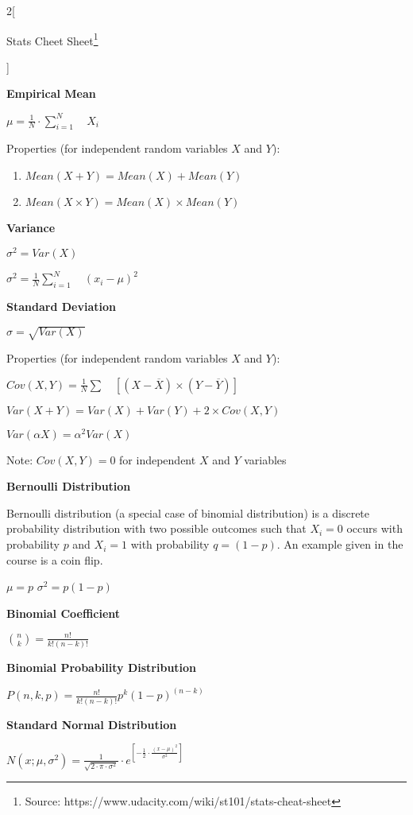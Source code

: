 \documentclass[9pt]{article}
\title{\mytitle}
\date{}
\newcommand{\mytitle}{Stats Cheet Sheet}
\begin{document}
\begin{multicols}{2}[
	\begin{center}
		\mytitle \footnote{Source: https://www.udacity.com/wiki/st101/stats-cheat-sheet}
	\end{center}]

	\textbf{Empirical Mean}
	
	$\mu =\frac{1}{N}\cdot \sum _{i=1}^N\quad X_i$
	
	Properties (for independent random variables $X$ and $Y$):
	\begin{enumerate}
	    \item $Mean(X+Y)=Mean(X)+Mean(Y)$
	   \item  $Mean(X\times Y)=Mean(X)\times Mean(Y)$
	\end{enumerate}
	
	
	\textbf{Variance}
	
	$\sigma^2=Var(X)$
	
	$\sigma^2=\frac{1}{N}\sum_{i=1}^N\quad(x_i-\mu)^2$
	
	
	\textbf{Standard Deviation}
	
	$\sigma=\sqrt{Var(X)}$
	
	Properties (for independent random variables $X$ and $Y$):
	
	$Cov(X,Y)=\frac{1}{N}\sum\quad[(X-\overline{X})\times(Y-\overline{Y})]$
	
	$Var(X+Y)=Var(X)+Var(Y)+2\times Cov(X,Y)$
	
	$Var(\alpha X)=\alpha^2Var(X)$
	
	Note: $Cov(X,Y)=0$ for independent $X$ and $Y$ variables


	\textbf{Bernoulli Distribution}

	Bernoulli distribution (a special case of binomial distribution) is a discrete probability distribution with two possible outcomes such that $X_i=0$ occurs with probability $p$ and $X_i=1$ with probability $q=(1-p)$. An example given in the course is a coin flip.
	
	$\mu=p$ \hspace{10 mm} $\sigma^2=p(1-p)$
	

	\textbf{Binomial Coefficient}
	
	${{n}\choose{k}}=\frac{n!}{k!(n-k)!}$
	
	
	\textbf{Binomial Probability Distribution}
	
	$P(n,k,p)=\frac{n!}{k!(n-k)!}p^k(1-p)^{(n-k)}$
	
	
	\textbf{Standard Normal Distribution}
	
	$N(x;\mu,\sigma^2)=\frac{1}{\sqrt{2\cdot\pi\cdot\sigma^2}}\cdot e^{[-\frac{1}{2}\cdot\frac{(x-\mu)^2}{\sigma^2}]}$
	

\end{multicols}
\end{document}
